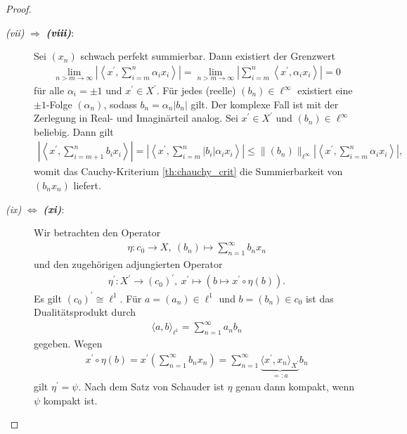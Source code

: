 \begin{proof}
\begin{description}
		\item[\textcolor{black}{\textit{ \itshape\textrm{(vii)}} $ \Rightarrow $ \textbf{\textit{\textrm{(viii)}}}:}]
		Sei $ (x_n) $ schwach perfekt summierbar.
		Dann existiert der Grenzwert
		\begin{align*}
			\lim\limits_{n > m \to \infty}
			\left|\left\langle x^\prime , 
			\sum \limits_{i = m}^n  \alpha_i x_i
			\right\rangle \right|
			=
			\lim\limits_{n > m \to \infty}
			\left|
			\sum \limits_{i = m}^n
			\left\langle x^\prime , 
			 \alpha_i x_i
			\right\rangle
			\right|
			=0
		\end{align*}
		für alle $ \alpha_i = \pm 1 $ und $ x^\prime \in X^\prime $.
		Für jedes (reelle) $ (b_n) \in \ell^\infty $ existiert eine $ \pm 1 $-Folge $ (\alpha_n) $, sodass $ b_n = \alpha_n | b_n| $ gilt. Der komplexe Fall ist mit der Zerlegung in Real- und Imaginärteil analog.
		Sei $ x^\prime  \in X^\prime$ und $ (b_n) \in \ell^\infty $ beliebig.
		Dann gilt
		\begin{align*}
			\left| \left\langle x^\prime , 
			\sum \limits_{i = m+1}^n  b_i x_i
			\right\rangle \right|
			=
			\left| \left\langle x^\prime , 
			\sum \limits_{i = m}^n  |b_i| \alpha_i x_i
			\right\rangle \right|
			\leq 
			\| (b_n) \|_{\ell^\infty}
			\left|  \left\langle x^\prime , 
			\sum \limits_{i = m}^n   \alpha_i x_i
			\right\rangle \right|,
		\end{align*}
		womit das Cauchy-Kriterium \ref{th:chauchy_crit} die Summierbarkeit von $ (b_nx_n) $ liefert.
		
		
		
		\item[\textit{ \itshape\textrm{(ix)}} $ \Leftrightarrow $ \textbf{\textit{\textrm{(xi)}}}:]
		Wir betrachten den Operator
		\begin{align*}
			 \eta: c_0 \to X, \ (b_n) \mapsto \sum \limits_{n = 1}^\infty b_n x_n
		\end{align*}
		und den zugehörigen adjungierten Operator
		\begin{align*}
			\eta^\prime : X^\prime \to (c_0)^\prime, \
			x^\prime \mapsto  (b \mapsto x^\prime \circ \eta (b)).
		\end{align*}
		Es gilt $ (c_0)^\prime \cong \ell^1 $. 
		Für $ a=  (a_n)  \in \ell^1$ und $ b=  (b_n) \in c_0 $ ist das Dualitätsprodukt durch
		\begin{align*}
			\langle a, b\rangle_{\ell^1 }
			=
			\sum \limits_{n = 1}^\infty a_n b_n
		\end{align*}
		gegeben.
		Wegen
		\begin{align*}
			x^\prime \circ \eta (b)
			=
			x^\prime 
			\left(
			\sum \limits_{n=1}^\infty b_n x_n 
			\right)
			=
			\sum 
			\limits_{n=1}^\infty \underbrace{\langle x^\prime, x_n \rangle_{X^\prime } }_{=: a} b_n
		\end{align*}
		gilt $ \eta^\prime = \psi $.
		Nach dem Satz von Schauder ist $ \eta $ genau dann kompakt, wenn $ \psi $ kompakt ist.
		

\end{description}
\end{proof}

